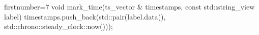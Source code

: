 \begin{cppcode*}{firstnumber=7}
void mark_time(ts_vector & timestamps, const std::string_view label) {
    timestamps.push_back(std::pair(label.data(), std::chrono::steady_clock::now()));
}
\end{cppcode*}
